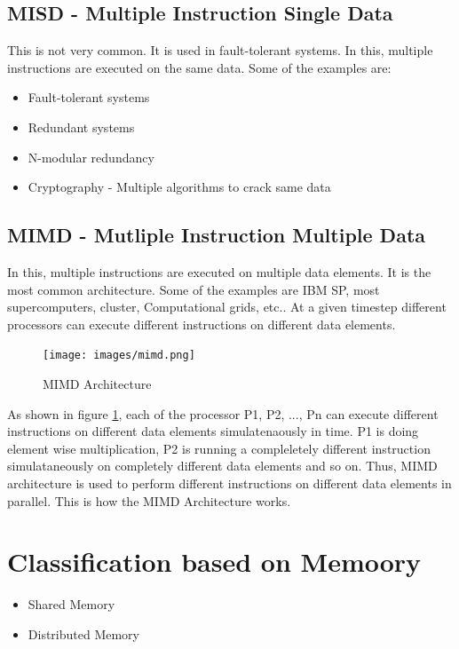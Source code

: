\documentclass[12pt]{article}
\begin{document}
\subsection{MISD - Multiple Instruction Single Data}
This is not very common. It is used in fault-tolerant systems. In this, multiple instructions are executed on the same data.
Some of the examples are:
\begin{itemize}
    \item Fault-tolerant systems
    \item Redundant systems
    \item N-modular redundancy
    \item Cryptography - Multiple algorithms to crack same data
\end{itemize}
\subsection{MIMD - Mutliple Instruction Multiple Data}
In this, multiple instructions are executed on multiple data elements. It is the most common architecture.
Some of the examples are IBM SP, most supercomputers, cluster, Computational grids, etc..
At a given timestep different processors can execute different instructions on different data elements.
\begin{figure}[H]
    \centering
    \texttt{[image: images/mimd.png]}
    \caption{MIMD Architecture}
    \label{fig:mimd}
\end{figure}
As shown in figure \ref{fig:mimd}, each of the processor P1, P2, ..., Pn can execute different instructions on different data elements simulatenaously in time.
P1 is doing element wise multiplication, P2 is running a compleletely different instruction simulataneously on completely different data elements and so on.
Thus, MIMD architecture is used to perform different instructions on different data elements in parallel. This is how the MIMD Architecture works.

\section{Classification based on Memoory}
\begin{itemize}
    \item Shared Memory
    \item Distributed Memory
\end{itemize}
\end{document}
